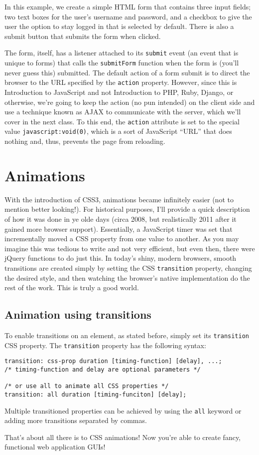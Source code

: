 \documentclass[12pt]{article}
\begin{document}
In this example, we create a simple HTML form that contains three input fields; two text boxes for the user's username and password, and a checkbox to give the user the option to stay logged in that is selected by default. There is also a submit button that submits the form when clicked.
\par
The form, itself, has a listener attached to its \texttt{submit} event (an event that is unique to forms) that calls the \texttt{submitForm} function when the form is (you'll never guess this) submitted. The default action of a form submit is to direct the browser to the URL specified by the \texttt{action} property. However, since this is Introduction to JavaScript and not Introduction to PHP, Ruby, Django, or otherwise, we're going to keep the action (no pun intended) on the client side and use a technique known as AJAX to communicate with the server, which we'll cover in the next class. To this end, the \texttt{action} attribute is set to the special value \texttt{javascript:void(0)}, which is a sort of JavaScript ``URL'' that does nothing and, thus, prevents the page from reloading. 

\section{Animations}
With the introduction of CSS3, animations became infinitely easier (not to mention better looking!). For historical purposes, I'll provide a quick description of how it was done in ye olde days (circa 2008, but realistically 2011 after it gained more browser support). Essentially, a JavaScript timer was set that incrementally moved a CSS property from one value to another. As you may imagine this was tedious to write and not very efficient, but even then, there were jQuery functions to do just this. In today's shiny, modern browsers, smooth transitions are created simply by setting the CSS \texttt{transition} property, changing the desired style, and then watching the browser's native implementation do the rest of the work. This is truly a good world.
\subsection{Animation using transitions}
To enable transitions on an element, as stated before, simply set its \texttt{transition} CSS property. The \texttt{transition} property has the following syntax:
\begin{Verbatim}[frame=single]
transition: css-prop duration [timing-function] [delay], ...;
/* timing-function and delay are optional parameters */

/* or use all to animate all CSS properties */
transition: all duration [timing-funciton] [delay];
\end{Verbatim}
Multiple transitioned properties can be achieved by using the \texttt{all} keyword or adding more transitions separated by commas.
\par
That's about all there is to CSS animations! Now you're able to create fancy, functional web application GUIs! 
\end{document}
